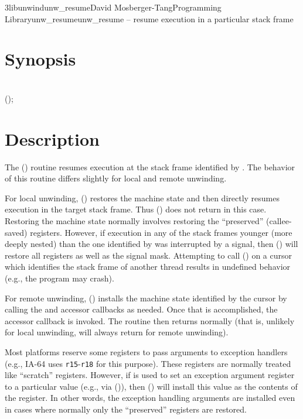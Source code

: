 \documentclass{article}
\begin{document}
\begin{Name}{3libunwind}{unw\_resume}{David Mosberger-Tang}{Programming Library}{unw\_resume}unw\_resume -- resume execution in a particular stack frame
\end{Name}

\section{Synopsis}

\\

 ();\\

\section{Description}

The () routine resumes execution at the stack frame
identified by .  The behavior of this routine differs
slightly for local and remote unwinding.

For local unwinding, () restores the machine state
and then directly resumes execution in the target stack frame.  Thus
() does not return in this case.  Restoring the
machine state normally involves restoring the ``preserved''
(callee-saved) registers.  However, if execution in any of the stack
frames younger (more deeply nested) than the one identified by
 was interrupted by a signal, then () will
restore all registers as well as the signal mask.  Attempting to call
() on a cursor which identifies the stack frame of
another thread results in undefined behavior (e.g., the program may
crash).

For remote unwinding, () installs the machine state
identified by the cursor by calling the  and
 accessor callbacks as needed.  Once that is
accomplished, the  accessor callback is invoked.  The
 routine then returns normally (that is, unlikely
for local unwinding,  will always return for remote
unwinding).

Most platforms reserve some registers to pass arguments to exception
handlers (e.g., IA-64 uses \texttt{r15}-\texttt{r18} for this
purpose).  These registers are normally treated like ``scratch''
registers.  However, if  is used to set an exception
argument register to a particular value (e.g., via
()), then () will install this
value as the contents of the register.  In other words, the exception
handling arguments are installed even in cases where normally only the
``preserved'' registers are restored.
\end{document}
